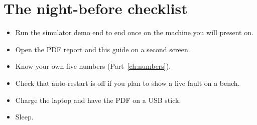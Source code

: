 \section{The night-before checklist}
\begin{itemize}
\item Run the simulator demo end to end once on the machine you will present on.
\item Open the PDF report and this guide on a second screen.
\item Know your own five numbers (Part~\ref{ch:numbers}).
\item Check that auto-restart is off if you plan to show a live fault on a bench.
\item Charge the laptop and have the PDF on a USB stick.
\item Sleep.
\end{itemize}
